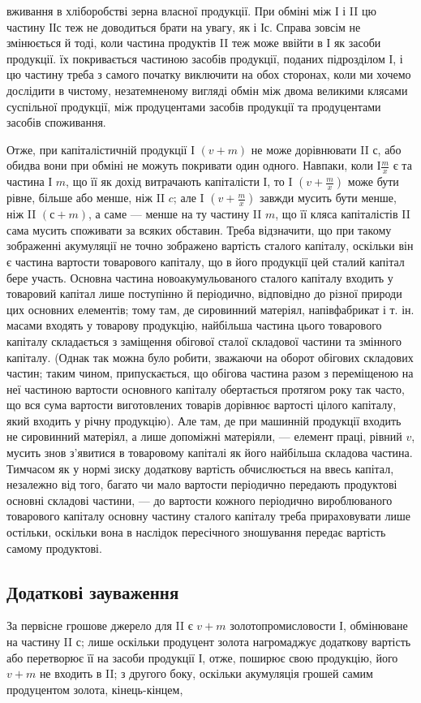 \parcont{}  %
вживання в хліборобстві зерна власної продукції. При обміні між І і II
цю частину ІІ$с$ теж не доводиться брати на увагу, як і І$с$. Справа зовсім
не змінюється й тоді, коли частина продуктів II теж може ввійти в І
як засоби продукції. їх покривається частиною засобів продукції, поданих
підрозділом І, і цю частину треба з самого початку виключити на обох
сторонах, коли ми хочемо дослідити в чистому, незатемненому вигляді
обмін між двома великими клясами суспільної продукції, між продуцентами
засобів продукції та продуцентами засобів споживання.

Отже, при капіталістичній продукції І $(v+ m)$ не може дорівнювати
II $с$, або обидва вони при обміні не можуть покривати один одного.
Навпаки, коли І$ \frac{m}{x}$ є та частина І $m$, що її як дохід витрачають капіталісти І,
то I $(v + \frac{m}{x})$ може бути рівне, більше або менше, ніж II $c$; але I $(v + \frac{m}{x})$
завжди мусить бути менше, ніж II $(с + m)$, а саме — менше на ту частину
II $m$, що її кляса капіталістів II сама мусить споживати за всяких обставин.
Треба відзначити, що при такому зображенні акумуляції не точно
зображено вартість сталого капіталу, оскільки він є частина вартости
товарового капіталу, що в його продукції цей сталий капітал бере участь.
Основна частина новоакумульованого сталого капіталу входить у товаровий
капітал лише поступінно й періодично, відповідно до різної природи
цих основних елементів; тому там, де сировинний матеріял, напівфабрикат
і т. ін. масами входять у товарову продукцію, найбільша частина
цього товарового капіталу складається з заміщення обігової сталої
складової частини та змінного капіталу. (Однак так можна було робити,
зважаючи на оборот обігових складових частин; таким чином, припускається,
що обігова частина разом з переміщеною на неї частиною вартости основного
капіталу обертається протягом року так часто, що вся сума вартости
виготовлених товарів дорівнює вартості цілого капіталу, який входить у
річну продукцію). Але там, де при машинній продукції входить не сировинний
матеріял, а лише допоміжні матеріяли, — елемент праці, рівний $v$,
мусить знов з’явитися в товаровому капіталі як його найбільша складова
частина. Тимчасом як у нормі зиску додаткову вартість обчислюється
на ввесь капітал, незалежно від того, багато чи мало вартости періодично
передають продуктові основні складові частини, — до вартости кожного
періодично вироблюваного товарового капіталу основну частину сталого
капіталу треба прираховувати лише остільки, оскільки вона в наслідок
пересічного зношування передає вартість самому продуктові.

\subsection{Додаткові зауваження}

За первісне грошове джерело для II є $v + m$ золотопромисловости І,
обмінюване на частину II $с$; лише оскільки продуцент золота нагромаджує
додаткову вартість або перетворює її на засоби продукції І, отже,
поширює свою продукцію, його $v + m$ не входить в II; з другого боку,
оскільки акумуляція грошей самим продуцентом золота, кінець-кінцем,
\parbreak{}  %
